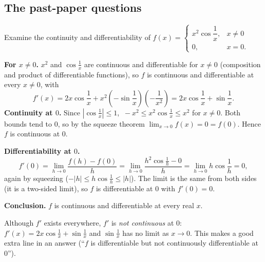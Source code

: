 \subsection{The past-paper questions}

\begin{example}[DU 3553 Q1(b)]
Examine the continuity and differentiability of
$f(x)=\begin{cases}x^2\cos\dfrac1x,&x\ne0\\ 0,&x=0.\end{cases}$
\end{example}
\begin{solution}
\textbf{For $x\ne0$.} $x^2$ and $\cos\frac1x$ are continuous and differentiable for $x\ne0$ (composition and product of differentiable functions), so $f$ is continuous and differentiable at every $x\ne0$, with
\[
f'(x)=2x\cos\frac1x+x^2\left(-\sin\frac1x\right)\left(-\frac1{x^2}\right)=2x\cos\frac1x+\sin\frac1x .
\]
\textbf{Continuity at $0$.} Since $|\cos\frac1x|\le1$, $\ -x^2\le x^2\cos\frac1x\le x^2$ for $x\ne0$. Both bounds tend to $0$, so by the squeeze theorem $\lim_{x\to0}f(x)=0=f(0)$. Hence $f$ is continuous at $0$.

\textbf{Differentiability at $0$.}
\[
f'(0)=\lim_{h\to0}\frac{f(h)-f(0)}{h}=\lim_{h\to0}\frac{h^2\cos\frac1h-0}{h}=\lim_{h\to0}h\cos\frac1h=0,
\]
again by squeezing ($-|h|\le h\cos\frac1h\le|h|$). The limit is the same from both sides (it is a two-sided limit), so $f$ is differentiable at $0$ with $f'(0)=0$.

\textbf{Conclusion.} $f$ is continuous and differentiable at every real $x$.
\end{solution}
\begin{remark}
Although $f'$ exists everywhere, $f'$ is \emph{not continuous} at $0$: $f'(x)=2x\cos\frac1x+\sin\frac1x$ and $\sin\frac1x$ has no limit as $x\to0$. This makes a good extra line in an answer (``$f$ is differentiable but not continuously differentiable at $0$'').
\end{remark}

